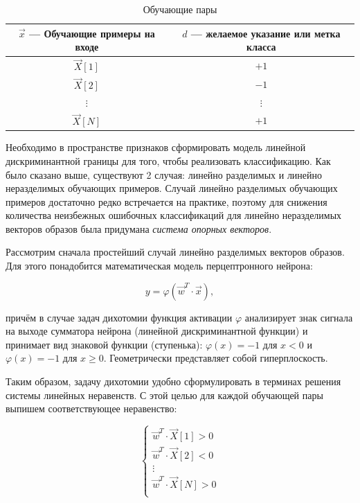 \documentclass{article}
\numberwithin{equation}{subsection}
\begin{document}
\begin{table}[htbp]
    \centering
    \begin{tabular}{c | c}
        $\vec{x}$ --- Обучающие примеры на входе & $d$ --- желаемое указание или метка класса \\\hline
        $\vec{X}[1]$                             & $+1$ \\\hline
        $\vec{X}[2]$                             & $-1$ \\\hline
        $\vdots$                                 & $\vdots$ \\\hline
        $\vec{X}[N]$                             & $+1$ \\\hline
        
    \end{tabular}
    \caption{Обучающие пары}
    \label{table:learn_pairs}
\end{table}

Необходимо в пространстве признаков сформировать модель линейной дискриминантной
границы для того, чтобы реализовать классификацию. Как было сказано выше, существуют
2 случая: линейно разделимых и линейно неразделимых обучающих примеров.
Случай линейно разделимых обучающих примеров достаточно редко встречается
на практике, поэтому для снижения количества неизбежных ошибочных классификаций
для линейно неразделимых векторов образов была придумана \textit{система опорных векторов}.

Рассмотрим сначала простейший случай линейно разделимых векторов образов. Для этого 
понадобится математическая модель перцептронного нейрона:

\begin{equation}
    y = \varphi(\vec{w}^T \cdot \vec{x}),
\end{equation}

\noindent
причём в случае задач дихотомии функция активации $\varphi$ анализирует знак сигнала 
на выходе сумматора нейрона (линейной дискриминантной функции) и принимает вид знаковой
функции (\glqq ступенька\grqq): $\varphi(x)=-1$ для $x<0$ и $\varphi(x)=-1$ для 
$x\geqslant0$. Геометрически представляет собой гиперплоскость.

Таким образом, задачу дихотомии удобно сформулировать в терминах решения системы линейных
неравенств. С этой целью для каждой обучающей пары выпишем соответствующее неравенство:

\begin{equation}
    \begin{cases}
        \vec{w}^T \cdot \vec{X}[1] > 0 \\
        \vec{w}^T \cdot \vec{X}[2] < 0 \\
        \vdots \\
        \vec{w}^T \cdot \vec{X}[N] > 0 \\
    \end{cases}
\end{equation}
\end{document}
